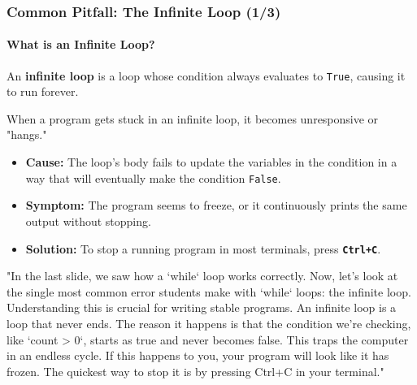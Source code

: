 \documentclass{beamer}
\begin{document}
\begin{frame}[fragile]
    \frametitle{Common Pitfall: The Infinite Loop (1/3)}
    \framesubtitle{What is an Infinite Loop?}
    
    An \textbf{infinite loop} is a loop whose condition always evaluates to \texttt{True}, causing it to run forever.
    \vspace{1em}
    
    When a program gets stuck in an infinite loop, it becomes unresponsive or "hangs."
    
    \begin{itemize}
        \item \textbf{Cause:} The loop's body fails to update the variables in the condition in a way that will eventually make the condition \texttt{False}.
        \item \textbf{Symptom:} The program seems to freeze, or it continuously prints the same output without stopping.
        \item \textbf{Solution:} To stop a running program in most terminals, press \textbf{\texttt{Ctrl+C}}.
    \end{itemize}

    \begin{note}
    "In the last slide, we saw how a `while` loop works correctly. Now, let's look at the single most common error students make with `while` loops: the infinite loop. Understanding this is crucial for writing stable programs. An infinite loop is a loop that never ends.
    The reason it happens is that the condition we're checking, like `count > 0`, starts as true and never becomes false. This traps the computer in an endless cycle. If this happens to you, your program will look like it has frozen. The quickest way to stop it is by pressing Ctrl+C in your terminal."
    \end{note}
\end{frame}
\end{document}
